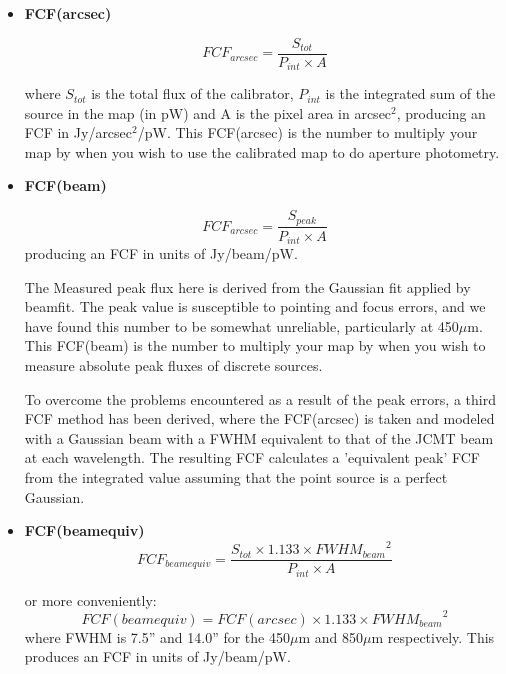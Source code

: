 \documentclass[twoside,11pt]{article}
\newcommand{\xref}[3]{#1}
\renewcommand{\_}{\texttt{\symbol{95}}}
\newcommand{\task}[1]{\textsf{#1}}
\newcommand{\beamfit}{\xref{\task{beamfit}}{sun95}{BEAMFIT}}
\begin{document}
\begin{itemize}

\item {\textbf{FCF(arcsec)}}

\begin{equation}
\label{eq:fcf_arcsec}
FCF_{arcsec} = \frac{S_{tot}}{P_{int} \times A}
\end{equation}

where $S_{tot}$ is the total flux of the calibrator, $P_{int}$ is the
integrated sum of the source in the map (in pW) and A is the pixel
area in arcsec$^2$, producing an FCF in Jy/arcsec$^2$/pW. This
FCF(arcsec) is the number to multiply your map by when you wish to use
the calibrated map to do aperture photometry.

\item{\textbf{FCF(beam)}}

\begin{equation}
\label{eq:fcf_beam}
FCF_{arcsec} = \frac{S_{peak}}{P_{int} \times A}
\end{equation}
producing an FCF in units of Jy/beam/pW.

The Measured peak flux here is derived from the Gaussian fit applied
by \beamfit. The peak value is susceptible to pointing and focus
errors, and we have found this number to be somewhat unreliable,
particularly at 450$\mu$m. This FCF(beam) is the number to multiply
your map by when you wish to measure absolute peak fluxes of discrete
sources.

To overcome the problems encountered as a result of the peak errors, a
third FCF method has been derived, where the FCF(arcsec) is taken and
modeled with a Gaussian beam with a FWHM equivalent to that of the
JCMT beam at each wavelength. The resulting FCF calculates a
'equivalent peak' FCF from the integrated value assuming that the
point source is a perfect Gaussian.

\item{\textbf{FCF(beamequiv)}}
\begin{equation}
\label{eq:fcf_beamequiv}
FCF_{beamequiv}  = \frac{S_{tot} \times 1.133 \times {FWHM_{beam}}^2}{P_{int} \times A}
\end{equation}

 or more conveniently:
\begin{equation}
FCF(beamequiv) = FCF(arcsec) \times 1.133 \times {FWHM_{beam}}^2
\end{equation}
where FWHM is 7.5'' and 14.0'' for the 450$\mu$m and 850$\mu$m
respectively. This produces an FCF in units of Jy/beam/pW.


\end{itemize}
\end{document}
